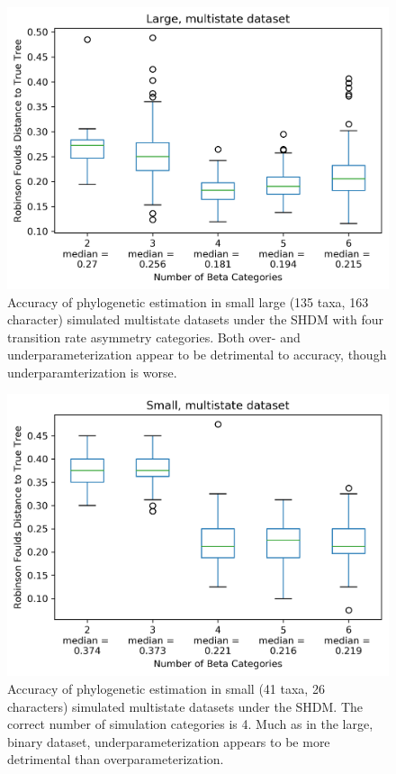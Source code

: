 \documentclass[]{article}
\begin{document}
\begin{figure}
  \caption{Accuracy of phylogenetic estimation in small large (135 taxa, 163 character) simulated multistate datasets under the SHDM with four transition rate asymmetry categories. Both over- and underparameterization appear to be detrimental to accuracy, though underparamterization is worse.} 
    \includegraphics{fig/LargeMultiState}
\end{figure} 

\begin{figure}
  \caption{Accuracy of phylogenetic estimation in small (41 taxa, 26 characters) simulated multistate datasets under the SHDM. The correct number of simulation categories is 4. Much as in the large, binary dataset, underparameterization appears to be more detrimental than overparameterization.} 
    \includegraphics{fig/SmallMS}
\end{figure} 
\end{document}
